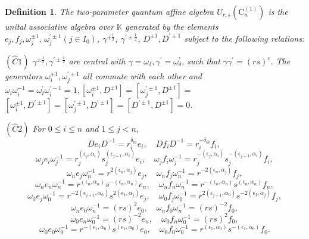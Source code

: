 \documentclass[10pt,a4paper]{amsart}
\newtheorem{defi}[theorem]{Definition}
\numberwithin{equation}{section}
\begin{document}
	\begin{defi} The two-parameter quantum affine algebra $U_{r, s}\left(\mathrm{C}_n^{(1)}\right)$ is the unital associative algebra over $\mathbb{K}$ generated by the elements $e_j, f_j, \omega_j^{ \pm 1}, \,\omega_j^{\prime \pm 1}\left(j \in I_0\right)$, $\gamma^{ \pm \frac{1}{2}}$, $ \gamma^{\prime \pm \frac{1}{2}}$, $D^{ \pm 1}, D^{\prime \pm 1}$ subject to
	the following relations:
		
		$(\hat{C} 1)$ $\gamma^{ \pm \frac{1}{2}}, \gamma^{\prime \pm \frac{1}{2}}$ are central with $\gamma=\omega_\delta, \gamma^{\prime}=\omega_\delta^{\prime}$, such that $\gamma \gamma^{\prime}=(r s)^c$. The generators $\omega_i^{ \pm 1}, \omega_j^{\prime \pm 1}$ all commute with each other
		and
		$\omega_i \omega_i^{-1}=\omega_i^{\prime} \omega_i^{\prime-1}=1,\left[\omega_i^{ \pm 1}, D^{ \pm 1}\right]=\left[\omega_j^{\prime \pm 1}, D^{ \pm 1}\right]=$
		$\left[\omega_i^{ \pm 1}, D^{\prime \pm 1}\right]=\left[\omega_j^{\prime \pm 1}, D^{\prime \pm 1}\right]=\left[D^{\prime \pm 1}, D^{ \pm 1}\right]=0$.
		
		$(\hat{C} 2)$ For $0 \leqslant i \leqslant n$ and $1 \leqslant j<n$,
		$$
		D e_i D^{-1}=r_i^{\delta_{0 i}} e_i, \quad D f_i D^{-1}=r_i^{-\delta_{0 i}} f_i \text {, }
		$$
		$$
		\omega_j e_i \omega_j^{-1}=r_j^{\left(\epsilon_j, \alpha_i\right)} s_j^{\left(\epsilon_{j+1}, \alpha_i\right)} e_i, \quad \omega_j f_i \omega_j^{-1}=r_j^{-\left(\epsilon_j, \alpha_i\right)} s_j^{-\left(\epsilon_{j+1}, \alpha_i\right)} f_i,
		$$
	$$
	\omega_n e_j \omega_n^{-1}=r^{2\left(\epsilon_n, \alpha_j\right)} e_j, \quad \omega_n f_j \omega_n^{-1}=r^{-2\left(\epsilon_n, \alpha_j\right)} f_j,
	$$
	$$
	\omega_n e_n \omega_n^{-1}=r^{\left(\epsilon_n, \alpha_n\right)} s^{-\left(\epsilon_n, \alpha_n\right)} e_n, \quad \omega_n f_n \omega_n^{-1}=r^{-\left(\epsilon_n, \alpha_n\right)} s^{\left(\epsilon_n, \alpha_n\right)} f_n,
	$$
	$$
	\omega_0 e_j \omega_0^{-1}=r^{-2\left(\epsilon_{j+1}, \alpha_0\right)} s^{2\left(\epsilon_1, \alpha_j\right)} e_j, \quad \omega_0 f_j \omega_0^{-1}=r^{2\left(\epsilon_{j+1}, \alpha_0\right)} s^{-2\left(\epsilon_1, \alpha_j\right)} f_j,
	$$
	$$
	\omega_n e_0 \omega_n^{-1}=(r s)^2 e_0, \quad \omega_n f_0 \omega_n^{-1}=(r s)^{-2} f_0,
	$$
	$$
	\omega_0 e_n \omega_0^{-1}=(r s)^{-2} e_n, \quad \omega_0 f_n \omega_0^{-1}=(r s)^2 f_0,
	$$
	$$
	\omega_0 e_0 \omega_0^{-1}=r^{-\left(\epsilon_1, \alpha_0\right)} s^{\left(\epsilon_1, \alpha_0\right)} e_0, \quad \omega_0 f_0 \omega_0^{-1}=r^{\left(\epsilon_1, \alpha_0\right)} s^{-\left(\epsilon_1, \alpha_0\right)} f_0.
	$$	


\end{defi}
\end{document}
